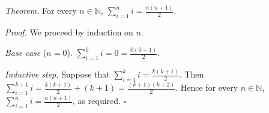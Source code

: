 \textit{Theorem.} For every $n \in \mathbb{N}$, $\sum_{i=1}^{n} i = \frac{n(n + 1)}{2}$.

\textit{Proof.} We proceed by induction on $n$.

\textit{Base case} ($n = 0$). $\sum_{i=1}^{0} i = 0 = \frac{0(0 + 1)}{2}$.

\textit{Inductive step.} Suppose that $\sum_{i=1}^{k} i = \frac{k(k + 1)}{2}$.
Then $\sum_{i=1}^{k + 1} i = \frac{k(k + 1)}{2} + (k + 1) = \frac{(k + 1)(k + 2)}{2}$.
Hence for every $n \in \mathbb{N}$, $\sum_{i=1}^{n} i = \frac{n(n + 1)}{2}$, as required. \hfill$\square$